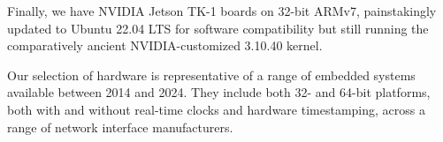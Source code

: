 Finally, we have NVIDIA Jetson TK-1 boards on 32-bit ARMv7,
painstakingly updated to Ubuntu 22.04 LTS for software compatibility but still
running the comparatively ancient NVIDIA-customized 3.10.40 kernel.

Our selection of hardware is representative
of a range of embedded systems available between 2014 and 2024.
They include both 32- and 64-bit platforms,
both with and without real-time clocks and hardware timestamping,
across a range of network interface manufacturers.




